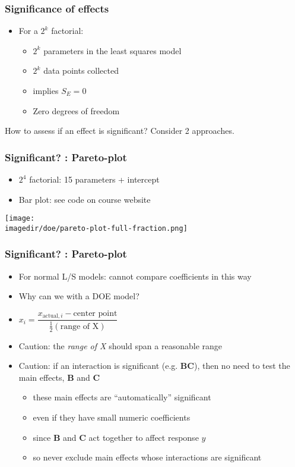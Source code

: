 \begin{frame}\frametitle{Significance of effects}
	\begin{itemize}
		\item	For a $2^k$ factorial:
		\begin{itemize}
			\item	$2^k$ parameters in the least squares model
			\item	$2^k$ data points collected
			\item	implies $S_E = 0$
			\item	Zero degrees of freedom
		\end{itemize}
	\end{itemize}

	How to assess if an effect is significant? Consider 2 approaches.
\end{frame}

\begin{frame}\frametitle{Significant? : Pareto-plot}
	\begin{itemize}
		\item	$2^4$ factorial: 15 parameters + intercept
		\item	Bar plot: see code on course website
	\end{itemize}
	\begin{center}
		\texttt{[image: \\imagedir/doe/pareto-plot-full-fraction.png]}
	\end{center}
\end{frame}

\begin{frame}\frametitle{Significant? : Pareto-plot}
	\begin{itemize}
		\item	For normal L/S models: cannot compare coefficients in this way
		\item	Why can we with a DOE model?
		\item	$x_i = \dfrac{x_{\text{actual}, i}- \text{center point}}{\frac{1}{2} (\text{range of X})}$
		\item	Caution: the \emph{range of X} should span a reasonable range
	\end{itemize}
	\begin{itemize}
		\item	Caution: if an interaction is significant (e.g. \textbf{BC}), then no need to test the main effects, \textbf{B} and \textbf{C}
		\begin{itemize}
			\item	these main effects are ``automatically'' significant
			\item	even if they have small numeric coefficients
			\item	since \textbf{B} and \textbf{C} act together to affect response $y$
			\item	so never exclude main effects whose interactions are significant
		\end{itemize}
	\end{itemize}
\end{frame}

